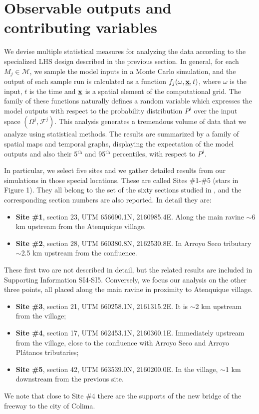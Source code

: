 \documentclass[nhess, manuscript]{copernicus}
\begin{document}
\section{Observable outputs and contributing variables}\label{s3}
We devise multiple statistical measures for analyzing the data according to the specialized LHS design described in the previous section. In general, for each $M_j\in\mathcal M$, we sample the model inputs in a Monte Carlo simulation, and the output of each sample run is calculated as a function $f_j(\omega, \underline{\textbf x},t)$, where $\omega$ is the input, $t$ is the time and $\underline{\textbf x}$ is a spatial element of the computational grid. The family of these functions naturally defines a random variable which expresses the model outputs with respect to the probability distribution $P^j$ over the input space $(\Omega^j, \mathcal F^j)$. This analysis generates a tremendous volume of data that we analyze using statistical methods. The results are summarized by a family of spatial maps and temporal graphs, displaying the expectation of the model outputs and also their 5$^{\mathrm{th}}$ and 95$^{\mathrm{th}}$ percentiles, with respect to $P^j$.

In particular, we select five sites and we gather detailed results from our simulations in those special locations. These are called Sites \#1-\#5  (stars in Figure 1). They all belong to the set of the sixty sections studied in \cite{Saucedo2008}, and the corresponding section numbers are also reported. In detail they are:
\begin{itemize}
\item\textbf{Site \#1}, section 23, UTM 656690.1N, 2160985.4E. Along the main ravine $\sim$6 km upstream from the Atenquique village.
\item\textbf{Site \#2}, section 28, UTM 660380.8N, 2162530.8E. In Arroyo Seco tributary $\sim$2.5 km upstream from the confluence.
\end{itemize}

These first two are not described in detail, but the related results are included in Supporting Information SI4-SI5. Conversely, we focus our analysis on the other three points, all placed along the main ravine in proximity to Atenquique village.
\begin{itemize}
\item\textbf{Site \#3}, section 21, UTM 660258.1N, 2161315.2E. It is $\sim$2 km upstream from the village;
\item\textbf{Site \#4}, section 17, UTM 662453.1N, 2160360.1E. Immediately upstream from the village, close to the confluence with Arroyo Seco and Arroyo Pl\'atanos tributaries;
\item\textbf{Site \#5}, section 42, UTM 663539.0N, 2160200.0E. In the village, $\sim$1 km downstream from the previous site.
\end{itemize}
We note that close to Site \#4 there are the supports of the new bridge of the freeway to the city of Colima.
\end{document}
